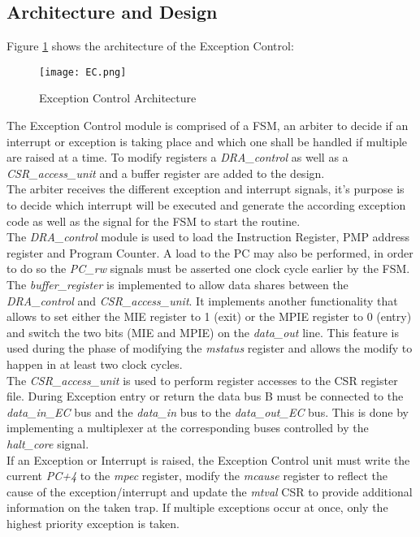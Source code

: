 \subsection{Architecture and Design}
Figure \ref{fig:EC} shows the architecture of the Exception Control:
\begin{figure}[H]
	\centering
	\texttt{[image: EC.png]}
	\caption{Exception Control Architecture}
	\label{fig:EC}
\end{figure}
The Exception Control module is comprised of a FSM, an arbiter to decide if an
interrupt or exception is taking place and which one shall be handled if multiple are raised at a time. To modify registers a \textit{DRA\_control} as well as a \textit{CSR\_access\_unit} and a buffer register are added to the design.\\
The arbiter receives the different exception and interrupt signals, it’s purpose is to decide which interrupt will be executed and generate the according exception code
as well as the signal for the FSM to start the routine.\\
The \textit{DRA\_control} module is used to load the Instruction Register, PMP address register and Program Counter. A load to the PC may also be performed, in order to do so the \textit{PC\_rw} signals must be asserted one clock cycle earlier by the FSM.\\
The \textit{buffer\_register} is implemented to allow data shares between the \textit{DRA\_control} and \textit{CSR\_access\_unit}. It implements another functionality that allows to set either the MIE register to 1 (exit) or the MPIE register to 0 (entry) and switch the two bits (MIE and MPIE) on the \textit{data\_out} line. This feature is used during the phase of modifying the \textit{mstatus} register and allows the modify to happen in at least two clock
cycles.\\
The \textit{CSR\_access\_unit} is used to perform register accesses to the CSR register file. During Exception entry or return the data bus B must be connected to the
\textit{data\_in\_EC} bus and the \textit{data\_in} bus to the \textit{data\_out\_EC} bus. This is done by implementing a multiplexer at the corresponding buses controlled by the\textit{ halt\_core} signal.\\
If an Exception or Interrupt is raised, the Exception Control unit must write the
current \textit{PC+4} to the \textit{mpec} register, modify the \textit{mcause} register to reflect the cause of the exception/interrupt and update the \textit{mtval} CSR to provide additional information on the taken trap. If multiple exceptions occur at once, only the highest priority exception is taken.\\
